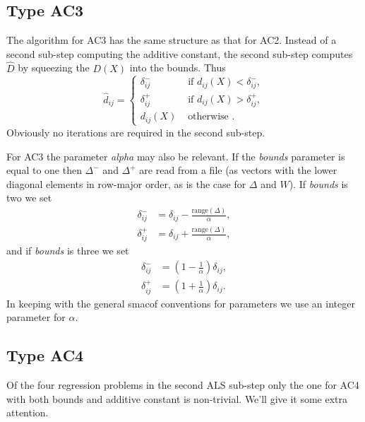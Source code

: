 \documentclass[
  12pt,
]{article}
\begin{document}
\subsection{Type AC3}\label{type-ac3}

The algorithm for AC3 has the same structure as that for AC2. Instead of
a second sub-step computing the additive constant, the second sub-step
computes \(\hat D\) by squeezing the \(D(X)\) into the bounds. Thus
\begin{equation}
\hat d_{ij}=\begin{cases}
\delta_{ij}^-&\text{ if }d_{ij}(X)<\delta_{ij}^-,\\
\delta_{ij}^+&\text{ if }d_{ij}(X)>\delta_{ij}^+,\\
d_{ij}(X)&\text{ otherwise }.
\end{cases}
\label{eq:updac3}
\end{equation}
Obviously no iterations are required in the second sub-step.

For AC3 the parameter \emph{alpha} may also be relevant. If the \emph{bounds} parameter
is equal to one then \(\Delta^-\) and \(\Delta^+\) are read from a file (as vectors with the lower diagonal elements in row-major order, as is the case for \(\Delta\) and \(W\)). If \emph{bounds}
is two we set
\begin{subequations}
\begin{align}
\delta_{ij}^-&=\delta_{ij}-\frac{\text{range}(\Delta)}{\alpha},\\
\delta_{ij}^+&=\delta_{ij}+\frac{\text{range}(\Delta)}{\alpha},
\end{align}
\end{subequations}
and if \emph{bounds} is three we set
\begin{subequations}
\begin{align}
\delta_{ij}^-&=(1-\frac{1}{\alpha})\delta_{ij},\\
\delta_{ij}^+&=(1+\frac{1}{\alpha})\delta_{ij}.
\end{align}
\end{subequations}
In keeping with the general smacof conventions for parameters we use an integer
parameter for \(\alpha\).

\subsection{Type AC4}\label{type-ac4}

Of the four regression problems in the second ALS sub-step only the one for AC4 with both bounds and additive constant is non-trivial. We'll give it some extra attention.
\end{document}

